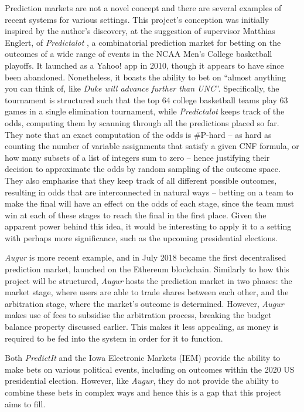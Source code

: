 \documentclass[10pt,a4paper]{article}
\theoremstyle{plain}
\theoremstyle{definition}
\begin{document}
	Prediction markets are not a novel concept and there are several examples
	of recent systems for various settings. This project's conception was
	initially inspired by the author's discovery, at the suggestion of
	supervisor Matthias Englert, of \emph{Predictalot} \cite{Predictalot}, a
	combinatorial prediction market for betting on the outcomes of a wide range
	of events in the NCAA Men's College basketball playoffs. It launched as a
	Yahoo! app in 2010, though it appears to have since been abandoned.
	Nonetheless, it boasts the ability to bet on ``almost anything you can
	think of, like \emph{Duke will advance further than UNC}''. Specifically,
	the tournament is structured such that the top 64 college basketball teams
	play 63 games in a single elimination tournament, while \emph{Predictalot}
	keeps track of the odds, computing them by scanning through all the
	predictions placed so far. They note that an exact computation of the odds
	is \#P-hard -- as hard as counting the number of variable assignments that
	satisfy a given CNF formula, or how many subsets of a list of integers sum
	to zero -- hence justifying their decision to approximate the odds by
	random sampling of the outcome space. They also emphasise that they keep
	track of all different possible outcomes, resulting in odds that are
	interconnected in natural ways -- betting on a team to make the final will
	have an effect on the odds of each stage, since the team must win at each
	of these stages to reach the final in the first place. Given the apparent
	power behind this idea, it would be interesting to apply it to a setting
	with perhaps more significance, such as the upcoming presidential
	elections.

	\emph{Augur} \cite{Augur} is more recent example, and in July 2018 became
	the first decentralised prediction market, launched on the Ethereum
	blockchain.  Similarly to how this project will be structured, \emph{Augur}
	hosts the prediction market in two phases: the market stage, where users
	are able to trade shares between each other, and the arbitration stage,
	where the market's outcome is determined. However, \emph{Augur} makes use
	of fees to subsidise the arbitration process, breaking the budget balance
	property discussed earlier. This makes it less appealing, as money is
	required to be fed into the system in order for it to function.

	Both \emph{PredictIt} \cite{PredictIt} and the Iowa Electronic Markets
	(IEM) \cite{IEM} provide the ability to make bets on various political
	events, including on outcomes within the 2020 US presidential election.
	However, like \emph{Augur}, they do not provide the ability to combine
	these bets in complex ways and hence this is a gap that this project aims
	to fill.
\end{document}
